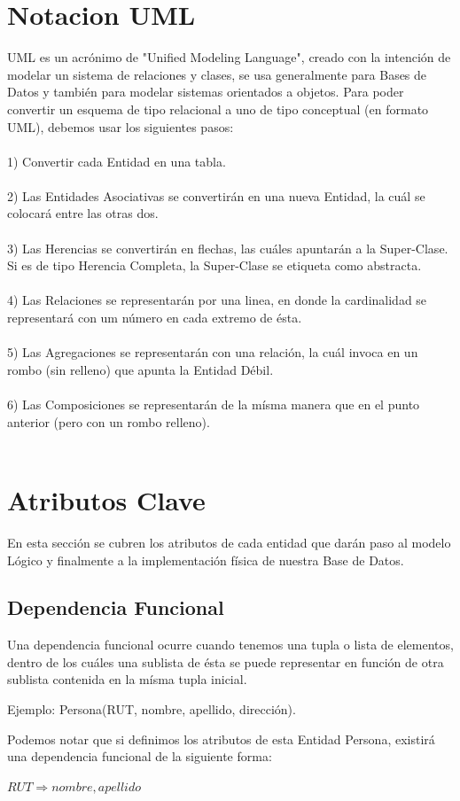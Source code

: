 \documentclass[12pt]{article}
\begin{document}
\section*{Notacion UML}
UML es un acrónimo de "Unified Modeling Language", creado con la intención de 
modelar un sistema de relaciones y clases, se usa generalmente para Bases de Datos 
y también para modelar sistemas orientados a objetos. Para poder convertir un 
esquema de tipo relacional a uno de tipo conceptual (en formato UML), debemos usar 
los siguientes pasos:
\\\\
1) Convertir cada Entidad en una tabla.
\\\\
2) Las Entidades Asociativas se convertirán en una nueva Entidad, la cuál se 
colocará entre las otras dos.
\\\\
3) Las Herencias se convertirán en flechas, las cuáles apuntarán a la Super-Clase. 
Si es de tipo Herencia Completa, la Super-Clase se etiqueta como abstracta.
\\\\
4) Las Relaciones se representarán por una linea, en donde la cardinalidad se 
representará con um número en cada extremo de ésta.
\\\\
5) Las Agregaciones se representarán con una relación, la cuál invoca en un rombo 
(sin relleno) que apunta la Entidad Débil.
\\\\
6) Las Composiciones se representarán de la mísma manera que en el punto anterior 
(pero con un rombo relleno).
\\\\

\newpage

\section*{Atributos Clave}
En esta sección se cubren los atributos de cada entidad que darán paso al modelo 
Lógico y finalmente a la implementación física de nuestra Base de Datos.

\subsection*{Dependencia Funcional}
Una dependencia funcional ocurre cuando tenemos una tupla o lista de elementos,
dentro de los cuáles una sublista de ésta se puede representar en función de otra
sublista contenida en la mísma tupla inicial.
\begin{center}
Ejemplo: Persona(RUT, nombre, apellido, dirección).
\end{center}
Podemos notar que si definimos los atributos de esta Entidad Persona, existirá una
dependencia funcional de la siguiente forma: 
\begin{center}
	$RUT \Rightarrow nombre, apellido$ 
\end{center}
\end{document}

